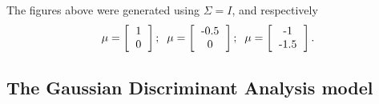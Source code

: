 \documentclass{article}
\begin{document}
The figures above were generated using $\Sigma = I$, and respectively
\[
\mu = \left[\begin{tabular}{c} 1 \\ 0 \end{tabular}\right]; \;\;
\mu = \left[\begin{tabular}{c} -0.5 \\ 0 \end{tabular}\right]; \;\;
\mu = \left[\begin{tabular}{c} -1 \\ -1.5 \end{tabular}\right].
\]


\subsection{The Gaussian Discriminant Analysis model}
\end{document}
